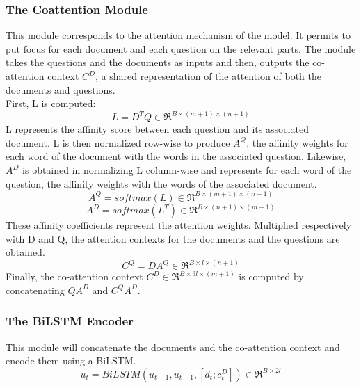 \documentclass[letterpaper, 10 pt, conference]{ieeeconf}  %
\begin{document}
\subsubsection{The Coattention Module}


This module corresponds to the attention mechanism of the model. It permits to put focus for each document and each question on the relevant parts.
The module takes the questions and the documents as inputs and then, outputs the co-attention context $C^D$, a shared representation of the attention of both the documents and questions.\\
First, L is computed:
\begin{equation}
L=D^{T}Q \in\Re^{B \times (m+1)\times(n+1)}
\end{equation}
L represents the affinity score between each question and its associated document. L is then normalized row-wise to produce $A^Q$, the affinity weights for each word of the document with the words in the associated question. Likewise, $A^D$ is obtained in normalizing L column-wise and represents for each word of the question, the affinity weights with the words of the associated document.
\begin{equation}
A^Q= softmax (L)\in \Re^{B \times(m+1)\times(n+1)}
\end{equation}
\begin{equation}
A^D= softmax(L^T)\in \Re^{B \times(n+1)\times(m+1)}
\end{equation}
These affinity coefficients represent the attention weights. Multiplied respectively with D and Q, the attention contexts for the documents and the questions are obtained.  
\begin{equation}
C^Q=DA^Q \in \Re^{B \times l \times(n+1)}
\end{equation}
Finally, the co-attention context $C^D \in \Re^{B \times 3l \times(m+1)}$ is computed by concatenating $QA^D$ and $C^QA^D$.\\

\subsubsection{The BiLSTM Encoder}

This module will concatenate the documents and the co-attention context and encode them using a BiLSTM. 
\begin{equation}
u_t= BiLSTM(u_{t-1},u_{t+1},[d_t;c_t^D])\in \Re^{B\times 2l}
\end{equation}
 
\end{document}
